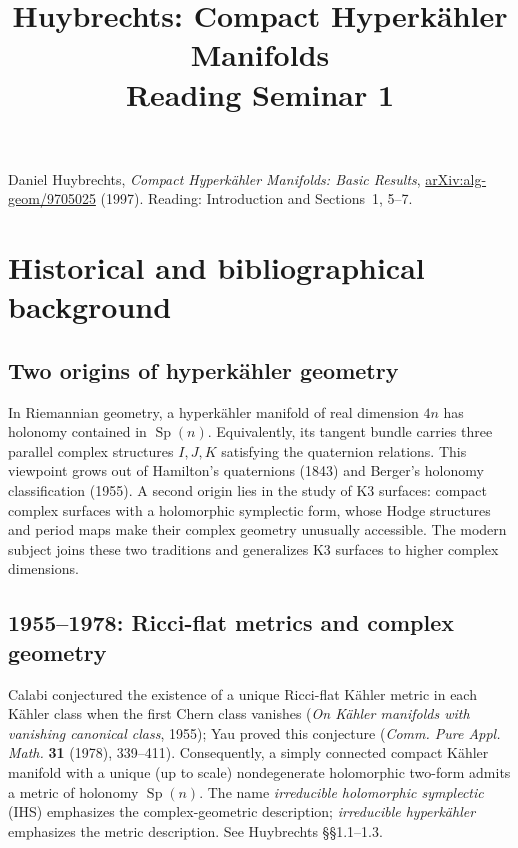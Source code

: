 \documentclass[11pt]{article}
\title{Huybrechts: Compact Hyperk\"ahler Manifolds\\Reading Seminar 1}
\date{}
\begin{document}
\maketitle

\noindent
Daniel Huybrechts, \emph{Compact Hyperk\"ahler Manifolds:
Basic Results}, \href{https://arxiv.org/abs/alg-geom/9705025}
{arXiv:alg-geom/9705025} (1997).
Reading: Introduction and Sections~1, 5--7.

{\small\tableofcontents}

\section{Historical and bibliographical background}

\subsection{Two origins of hyperk\"ahler geometry}
In Riemannian geometry, a hyperk\"ahler manifold
of real dimension $4n$ has holonomy contained in
$\operatorname{Sp}(n)$. Equivalently, its tangent
bundle carries three parallel complex structures
$I,J,K$ satisfying the quaternion relations.
This viewpoint grows out of Hamilton's quaternions
(1843) and Berger's holonomy classification (1955).
A second origin lies in the study of K3 surfaces:
compact complex surfaces with a holomorphic
symplectic form, whose Hodge structures and
period maps make their complex geometry unusually
accessible. The modern subject joins these two
traditions and generalizes K3 surfaces to higher
complex dimensions.

\subsection{1955--1978: Ricci-flat metrics and complex geometry}
Calabi conjectured the existence of a unique
Ricci-flat K\"ahler metric in each K\"ahler class
when the first Chern class vanishes
(\emph{On K\"ahler manifolds with vanishing
canonical class}, 1955); Yau proved this
conjecture (\emph{Comm. Pure Appl. Math.}
\textbf{31} (1978), 339--411).
Consequently, a simply connected compact
K\"ahler manifold with a unique (up to scale)
nondegenerate holomorphic two-form admits
a metric of holonomy $\operatorname{Sp}(n)$.
The name \emph{irreducible holomorphic symplectic}
(IHS) emphasizes the complex-geometric description;
\emph{irreducible hyperk\"ahler} emphasizes the metric
description. See Huybrechts \S\S1.1--1.3.
\end{document}
